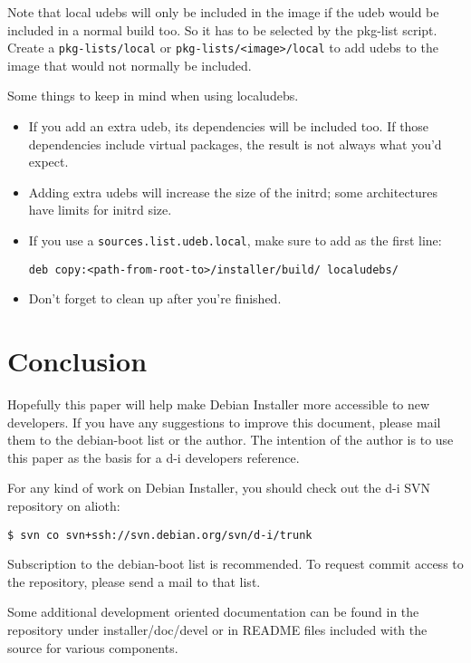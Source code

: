 \documentclass[a4paper,10pt]{article}
\begin{document}
Note that local udebs will only be included in the image if the udeb would be included in a normal build too. So it has to be selected by the pkg-list script. Create a \texttt{pkg-lists/local} or \texttt{pkg-lists/<image>/local} to add udebs to the image that would not normally be included. 

Some things to keep in mind when using localudebs. 

\begin{itemize}
\item If you add an extra udeb, its dependencies will be included too. If those dependencies include virtual packages, the result is not always what you'd expect. 
\item Adding extra udebs will increase the size of the initrd; some architectures have limits for initrd size. 
\item If you use a \texttt{sources.list.udeb.local}, make sure to add as the first line:
\begin{verbatim}
deb copy:<path-from-root-to>/installer/build/ localudebs/
\end{verbatim}
\item Don't forget to clean up after you're finished. 
\end{itemize}


\section{Conclusion}

Hopefully this paper will help make Debian Installer more accessible to new developers. If you have any suggestions to improve this document, please mail them to the debian-boot list or the author. The intention of the author is to use this paper as the basis for a d-i developers reference. 

For any kind of work on Debian Installer, you should check out the d-i SVN repository on alioth:

\begin{verbatim}
$ svn co svn+ssh://svn.debian.org/svn/d-i/trunk
\end{verbatim}

Subscription to the debian-boot list is recommended. To request commit access to the repository, please send a mail to that list.

Some additional development oriented documentation can be found in the repository under installer/doc/devel or in README files included with the source for various components.
\end{document}
